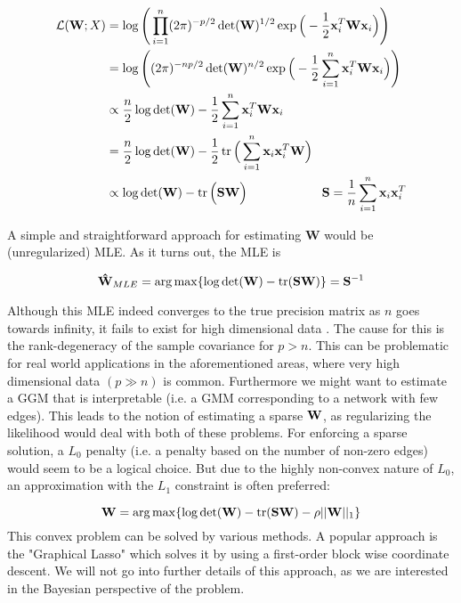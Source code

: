 \begin{align*}
	\mathcal{L}(\mathbf{W}; X) & = \log\Bigg( 
	\prod_{i=1}^{n}
	(2\pi)^{-p/2} \det(\mathbf{W})^{1/2} \exp\Big(
	-\frac{1}{2} \mathbf{x}_i^T \mathbf{W} \mathbf{x}_i
	\Big)
	\Bigg)
	\\
	                         & =            
	\log\Bigg(
	(2\pi)^{-np/2} 
	\det(\mathbf{W})^{n/2} 
	\exp\Big(
	-\frac{1}{2} \sum_{i=1}^{n}\mathbf{x}_i^T \mathbf{W} \mathbf{x}_i
	\Big)
	\Bigg)
	\\
	                         & \propto      
	\frac{n}{2}\log\det(\mathbf{W})
	-\frac{1}{2} \sum_{i=1}^{n}\mathbf{x}_i^T \mathbf{W} \mathbf{x}_i
	\\
	                         & =            
	\frac{n}{2}\log\det(\mathbf{W})
	-\frac{1}{2} 
	\operatorname{tr}\Big(
	\sum_{i=1}^{n} \mathbf{x}_i \mathbf{x}_i^T \mathbf{W}
	\Big)
	\\
	                         & \propto      
	\log\det(\mathbf{W})
	-\operatorname{tr}\Big(
	\mathbf{S} \mathbf{W}
	\Big)
	\quad\quad\quad\quad\quad\quad
	\mathbf{S}= 	\frac{ 1}{n}\sum_{i=1}^{n} \mathbf{x}_i \mathbf{x}_i^T
\end{align*}

A simple and straightforward approach for estimating $\bm{W}$ would be (unregularized) \gls{MLE}. As it turns out, the \gls{MLE} is

$$
\mathbf{\hat{W}}_{MLE} = \arg\max\{
\log\det (\mathbf{W}) - \operatorname{tr}({\mathbf{S}\mathbf{W}})
\}
= \mathbf{S}^{-1}
$$


Although this MLE indeed converges to the true precision matrix as $n$ goes towards infinity, it fails to exist for high dimensional data \citep[Chapter 9.3.1]{hastie2015statistical}. 
The cause for this is the rank-degeneracy of the sample covariance for $p>n$.
This can be problematic for real world applications in the aforementioned areas, where very high dimensional data $(p\gg n)$ is common.
Furthermore we might want to estimate a \gls{GGM} that is interpretable (i.e. a GMM corresponding to a network with few edges).
This leads to the notion of estimating a sparse $\mathbf{W}$, as regularizing the likelihood would deal with both of these problems.
For enforcing a sparse solution, a $L_0$ penalty (i.e. a penalty based on the number of non-zero edges) would seem to be a logical choice.
But due to the highly non-convex nature of $L_0$, an approximation with the $L_1$ constraint is often preferred:

\begin{equation}
	\mathbf{W} = \arg \max \{ \log \det(\mathbf{W}) - \operatorname{tr}(\mathbf{SW}) - \rho ||\mathbf{W}||_1 \}
\end{equation}
This convex problem can be solved by various methods.
A popular approach is the "Graphical Lasso" \citep{friedman_sparse_2008} which solves
it by using a first-order block wise coordinate descent.
We will not go into further details of this approach, as we are interested in the Bayesian perspective of the problem.


